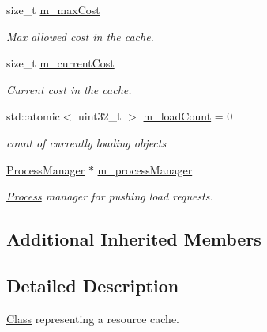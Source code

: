 \begin{DoxyCompactItemize}
size\+\_\+t \mbox{\hyperlink{classrev_1_1_resource_cache_a20583eb6f96119d6c5d2bd9dfcc782f5}{m\+\_\+max\+Cost}}
\begin{DoxyCompactList}\small\item\em Max allowed cost in the cache. \end{DoxyCompactList}\item 
\mbox{\label{classrev_1_1_resource_cache_a59a405f4165f5d35bdbe17589f27323b}} 
size\+\_\+t \mbox{\hyperlink{classrev_1_1_resource_cache_a59a405f4165f5d35bdbe17589f27323b}{m\+\_\+current\+Cost}}
\begin{DoxyCompactList}\small\item\em Current cost in the cache. \end{DoxyCompactList}\item 
\mbox{\label{classrev_1_1_resource_cache_a0efa494ac6d630bdcc41192599ffe3e4}} 
std\+::atomic$<$ uint32\+\_\+t $>$ \mbox{\hyperlink{classrev_1_1_resource_cache_a0efa494ac6d630bdcc41192599ffe3e4}{m\+\_\+load\+Count}} = 0
\begin{DoxyCompactList}\small\item\em count of currently loading objects \end{DoxyCompactList}\item 
\mbox{\label{classrev_1_1_resource_cache_aa8ea5605d35ba8b7f35307da5e970ddf}} 
\mbox{\hyperlink{classrev_1_1_process_manager}{Process\+Manager}} $\ast$ \mbox{\hyperlink{classrev_1_1_resource_cache_aa8ea5605d35ba8b7f35307da5e970ddf}{m\+\_\+process\+Manager}}
\begin{DoxyCompactList}\small\item\em \mbox{\hyperlink{classrev_1_1_process}{Process}} manager for pushing load requests. \end{DoxyCompactList}\end{DoxyCompactItemize}
\subsection*{Additional Inherited Members}


\subsection{Detailed Description}
\mbox{\hyperlink{struct_class}{Class}} representing a resource cache. 

